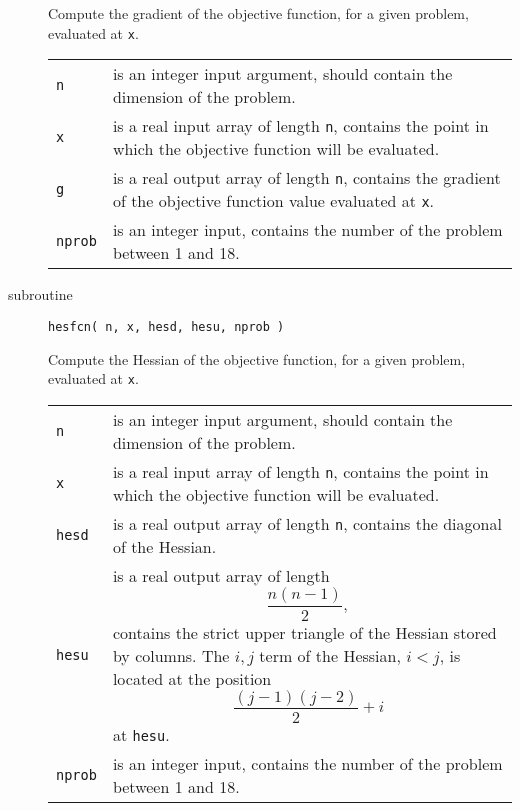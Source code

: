 \documentclass[11pt]{article}
\begin{document}
\begin{description}
  Compute the gradient of the objective function, for a given problem,
  evaluated at \verb|x|.

  \begin{longtable}{p{1cm} p{13.4cm}}
    \verb|n| & is an integer input argument, should contain the
    dimension of the problem. \\[1ex]

    \verb|x| & is a real input array of length \verb|n|, contains the
    point in which the objective function will be evaluated. \\[1ex]

    \verb|g| & is a real output array of length \verb|n|, contains the
    gradient of the objective function value evaluated at
    \verb|x|. \\[1ex]

    \verb|nprob| & is an integer input, contains the number of the
    problem between 1 and 18.
  \end{longtable}

\item[subroutine] \verb|hesfcn( n, x, hesd, hesu, nprob )|

  Compute the Hessian of the objective function, for a given problem,
  evaluated at \verb|x|.

  \begin{longtable}{p{1cm} p{13.4cm}}
    \verb|n| & is an integer input argument, should contain the
    dimension of the problem. \\[1ex]

    \verb|x| & is a real input array of length \verb|n|, contains the
    point in which the objective function will be evaluated. \\[1ex]

    \verb|hesd| & is a real output array of length \verb|n|, contains
    the diagonal of the Hessian. \\[1ex]

    \verb|hesu| & is a real output array of length
    \[
    \displaystyle \frac{n(n-1)}{2},
    \]
    contains the strict upper triangle of the Hessian stored by
    columns. The $i,j$ term of the Hessian, $i<j$, is located at the
    position
    \[
    \displaystyle \frac{(j-1)(j-2)}{2} + i
    \]
    at \verb|hesu|. \\[1ex]

    \verb|nprob| & is an integer input, contains the number of the
    problem between 1 and 18.
  \end{longtable}


\end{description}
\end{document}
